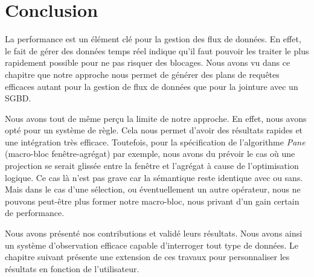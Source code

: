 \section{Conclusion}\label{sec:valid:perfs:conclusion}
La performance est un élément clé pour la gestion des flux de données. En effet, le fait de gérer des données temps réel indique qu'il faut pouvoir les traiter le plus rapidement possible pour ne pas risquer des blocages. Nous avons vu dans ce chapitre que notre approche nous permet de générer des plans de requêtes efficaces autant pour la gestion de flux de données que pour la jointure avec un SGBD.

Nous avons tout de même perçu la limite de notre approche. En effet, nous avons opté pour un système de règle. Cela nous permet d'avoir des résultats rapides et une intégration très efficace. Toutefois, pour la spécification de l'algorithme \textit{Pane} (macro-bloc fenêtre-agrégat) par exemple, nous avons du prévoir le cas où une projection se serait glissée entre la fenêtre et l'agrégat à cause de l'optimisation logique. Ce cas là n'est pas grave car la sémantique reste identique avec ou sans. Mais dans le cas d'une sélection, ou éventuellement un autre opérateur, nous ne pouvons peut-être plus former notre macro-bloc, nous privant d'un gain certain de performance.

Nous avons présenté nos contributions et validé leurs résultats. Nous avons ainsi un système d'observation efficace capable d'interroger tout type de données. Le chapitre suivant présente une extension de ces travaux pour personnaliser les résultats en fonction de l'utilisateur.